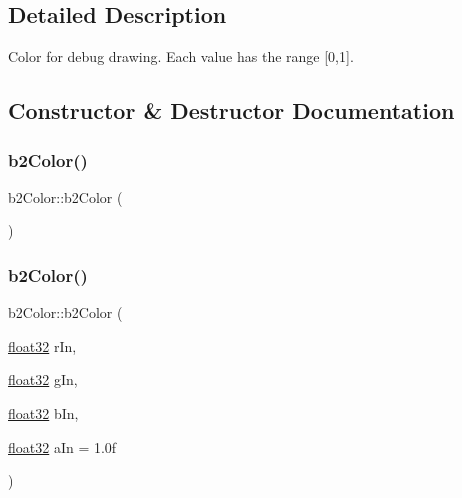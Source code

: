 \subsection{Detailed Description}
Color for debug drawing. Each value has the range \mbox{[}0,1\mbox{]}. 

\subsection{Constructor \& Destructor Documentation}
\mbox{\label{structb2_color_aab8716defcdf745729d1164cd8b08437}} 
\subsubsection{\texorpdfstring{b2Color()}{b2Color()}\hspace{0.1cm}{\footnotesize\ttfamily [1/2]}}
{\footnotesize\ttfamily b2\+Color\+::b2\+Color (\begin{DoxyParamCaption}{ }\end{DoxyParamCaption})\hspace{0.3cm}{\ttfamily [inline]}}

\mbox{\label{structb2_color_a7cceec6dae0dccd757f35eacd41595c6}} 
\subsubsection{\texorpdfstring{b2Color()}{b2Color()}\hspace{0.1cm}{\footnotesize\ttfamily [2/2]}}
{\footnotesize\ttfamily b2\+Color\+::b2\+Color (\begin{DoxyParamCaption}\item[{\mbox{\hyperlink{b2_settings_8h_aacdc525d6f7bddb3ae95d5c311bd06a1}{float32}}}]{r\+In,  }\item[{\mbox{\hyperlink{b2_settings_8h_aacdc525d6f7bddb3ae95d5c311bd06a1}{float32}}}]{g\+In,  }\item[{\mbox{\hyperlink{b2_settings_8h_aacdc525d6f7bddb3ae95d5c311bd06a1}{float32}}}]{b\+In,  }\item[{\mbox{\hyperlink{b2_settings_8h_aacdc525d6f7bddb3ae95d5c311bd06a1}{float32}}}]{a\+In = {\ttfamily 1.0f} }\end{DoxyParamCaption})\hspace{0.3cm}{\ttfamily [inline]}}




